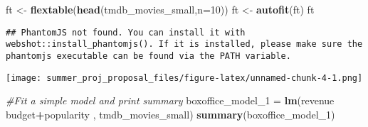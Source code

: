 \documentclass[
]{article}
\newenvironment{Shaded}{\begin{snugshade}}{\end{snugshade}}
\newcommand{\CommentTok}[1]{\textcolor[rgb]{0.56,0.35,0.01}{\textit{#1}}}
\newcommand{\DataTypeTok}[1]{\textcolor[rgb]{0.13,0.29,0.53}{#1}}
\newcommand{\DecValTok}[1]{\textcolor[rgb]{0.00,0.00,0.81}{#1}}
\newcommand{\KeywordTok}[1]{\textcolor[rgb]{0.13,0.29,0.53}{\textbf{#1}}}
\newcommand{\NormalTok}[1]{#1}
\newcommand{\OperatorTok}[1]{\textcolor[rgb]{0.81,0.36,0.00}{\textbf{#1}}}
\newcommand{\OtherTok}[1]{\textcolor[rgb]{0.56,0.35,0.01}{#1}}
\newcommand{\StringTok}[1]{\textcolor[rgb]{0.31,0.60,0.02}{#1}}
\begin{document}
\begin{Shaded}
\begin{Highlighting}[]
\NormalTok{ft <-}\StringTok{ }\KeywordTok{flextable}\NormalTok{(}\KeywordTok{head}\NormalTok{(tmdb_movies_small,}\DataTypeTok{n=}\DecValTok{10}\NormalTok{))}
\NormalTok{ft <-}\StringTok{ }\KeywordTok{autofit}\NormalTok{(ft)}
\NormalTok{ft}
\end{Highlighting}
\end{Shaded}

\begin{verbatim}
## PhantomJS not found. You can install it with webshot::install_phantomjs(). If it is installed, please make sure the phantomjs executable can be found via the PATH variable.
\end{verbatim}

\texttt{[image: summer\_proj\_proposal\_files/figure-latex/unnamed-chunk-4-1.png]}

\begin{Shaded}
\end{Shaded}

\begin{Shaded}
\begin{Highlighting}[]
\CommentTok{#Fit a simple  model and print summary}
\NormalTok{boxoffice_model_}\DecValTok{1}\NormalTok{ =}\StringTok{ }\KeywordTok{lm}\NormalTok{(revenue }\OperatorTok{~}\StringTok{  }\NormalTok{budget}\OperatorTok{+}\NormalTok{popularity , tmdb_movies_small)}
\KeywordTok{summary}\NormalTok{(boxoffice_model_}\DecValTok{1}\NormalTok{)}
\end{Highlighting}
\end{Shaded}
\end{document}

